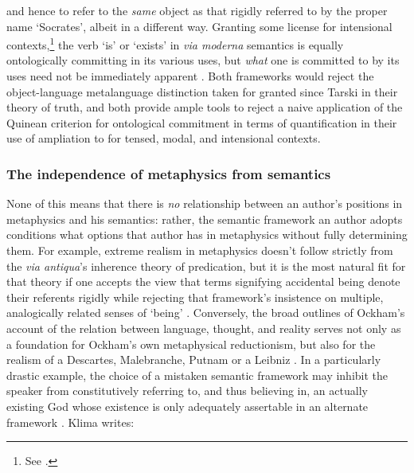 \documentclass[]{article}
\begin{document}
and hence to refer to the \emph{same} object as that rigidly referred to by the proper name `Socrates', 
albeit in a different way. 
Granting some license for intensional contexts,\footnote{See \autocite{Klima2005}.} 
the verb `is' or `exists' in \emph{via moderna} semantics is equally ontologically committing in its various uses, 
but \emph{what} one is committed to by its uses need not be immediately apparent \autocite[437-430]{Klima2008a}.
Both frameworks would reject the object-language metalanguage distinction taken for granted since Tarski in their theory of truth,
and both provide ample tools to reject a naive application of the Quinean criterion for ontological commitment in terms of quantification in their use of ampliation to for tensed, modal, and intensional contexts.

\subsubsection{The independence of metaphysics from semantics}
None of this means that there is \emph{no} relationship between an author's positions in metaphysics and his semantics: 
rather, the semantic framework an author adopts conditions what options that author has in metaphysics without fully determining them. 
For example, extreme realism in metaphysics doesn't follow strictly from the \emph{via antiqua}'s inherence theory of predication, 
but it is the most natural fit for that theory 
if one accepts the view that terms signifying accidental being denote their referents rigidly 
while rejecting that framework's insistence on multiple, analogically related senses of `being' \autocite{Klima1999}. 
Conversely, the broad outlines of Ockham's account of the relation between language, thought, and reality 
serves not only as a foundation for Ockham's own metaphysical reductionism, 
but also for the realism of a Descartes, Malebranche, Putnam or a Leibniz \autocite{Klima1991}. 
In a particularly drastic example, the choice of a mistaken semantic framework may inhibit the speaker from constitutively referring to, 
and thus believing in, 
an actually existing God whose existence is only adequately assertable in an alternate framework \autocite[74]{Klima2008b}. %
Klima writes: 
\end{document}
